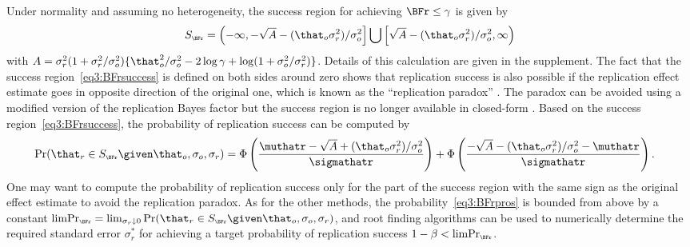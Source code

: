 Under normality and assuming no heterogeneity, the success region for achieving
$\BFr \leq \gamma$ is given by
\begin{align}
  \label{eq3:BFrsuccess}
  S_{\scriptscriptstyle \BFr}
  = \left(-\infty, -\sqrt{A} - (\that_{o}\sigma^{2}_{r})/\sigma^{2}_{o}\right] \bigcup
   \left[\sqrt{A} - (\that_{o}\sigma^{2}_{r})/\sigma^{2}_{o}, \infty\right)
\end{align}
with
$A = \sigma^{2}_{r}(1 + \sigma^{2}_{r}/\sigma^{2}_{o}) \{\that_{o}^{2}/\sigma^{2}_{o} - 2 \log \gamma + \log(1 + \sigma^{2}_{o}/\sigma^{2}_{r})\}$.
Details of this calculation are given in the supplement. The fact that the
success region~\eqref{eq3:BFrsuccess} is defined on both sides around zero shows
that replication success is also possible if the replication effect estimate
goes in opposite direction of the original one, which is known as the
``replication paradox'' \citep{Ly2018}. The paradox can be avoided using a
modified version of the replication Bayes factor but the success region is no
longer available in closed-form \citep[Appendix D]{Pawel2022b}. Based on the
success region~\eqref{eq3:BFrsuccess}, the probability of replication success can
be computed by
\begin{align}
  \label{eq3:BFrpros}
  \Pr(\that_{r} \in S_{\scriptscriptstyle \BFr} \given \that_{o}, \sigma_{o}, \sigma_{r})
  &=%
      \Phi\left(\frac{\muthatr - \sqrt{A} + (\that_{o}\sigma^{2}_{r})/\sigma^{2}_{o}}{
      \sigmathatr}\right)
    + \Phi\left(\frac{-\sqrt{A} - (\that_{o}\sigma^{2}_{r})/\sigma^{2}_{o}
- \muthatr}{\sigmathatr}\right).
\end{align}
One may want to compute the probability of replication success only for the part
of the success region with the same sign as the original effect estimate to
avoid the replication paradox. As for the other methods, the
probability~\eqref{eq3:BFrpros} is bounded from above by a constant
$\text{limPr}_{\scriptscriptstyle \BFr} = \lim_{\sigma_{r} \downarrow 0} \Pr(\that_r \in S_{\scriptscriptstyle \BFr} \given \that_{o}, \sigma_{o}, \sigma_{r})$,
and root finding algorithms can be used to numerically determine the required
standard error $\sigma^{*}_{r}$ for achieving a target probability of
replication success $1 - \beta < \text{limPr}_{\scriptscriptstyle \BFr}$.


